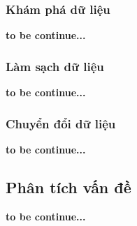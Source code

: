 \subsubsection{Khám phá dữ liệu}
\textbf{to be continue...}\\
\subsubsection{Làm sạch dữ liệu}
\textbf{to be continue...}\\
\subsubsection{Chuyển đổi dữ liệu}
\textbf{to be continue...}\\
\subsection{Phân tích vấn đề}
\textbf{to be continue...}\\
